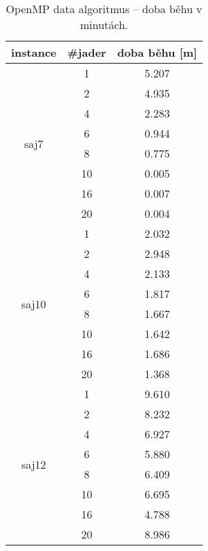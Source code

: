 \documentclass{article}
\begin{document}
    \begin{table}[h]
        \centering
        \begin{tabular}{|c|c|c|}
            \hline
            \multicolumn{1}{|l|}{\textbf{instance}} & \multicolumn{1}{l|}{\textbf{\#jader}} & \textbf{doba běhu} {[}m{]} \\ \hline
            \multirow{8}{*}{saj7}  & 1  & 5.207 \\
            & 2  & 4.935 \\
            & 4  & 2.283 \\
            & 6  & 0.944 \\
            & 8  & 0.775 \\
            & 10 & 0.005 \\
            & 16 & 0.007 \\
            & 20 & 0.004 \\ \hline
            \multirow{8}{*}{saj10} & 1  & 2.032 \\
            & 2  & 2.948 \\
            & 4  & 2.133 \\
            & 6  & 1.817 \\
            & 8  & 1.667 \\
            & 10 & 1.642 \\
            & 16 & 1.686 \\
            & 20 & 1.368 \\ \hline
            \multirow{8}{*}{saj12} & 1  & 9.610 \\
            & 2  & 8.232 \\
            & 4  & 6.927 \\
            & 6  & 5.880 \\
            & 8  & 6.409 \\
            & 10 & 6.695 \\
            & 16 & 4.788 \\
            & 20 & 8.986 \\ \hline
        \end{tabular}
        \caption{OpenMP data algoritmus -- doba běhu v minutách.}
        \label{tab:openmp-data}
    \end{table}
\end{document}
